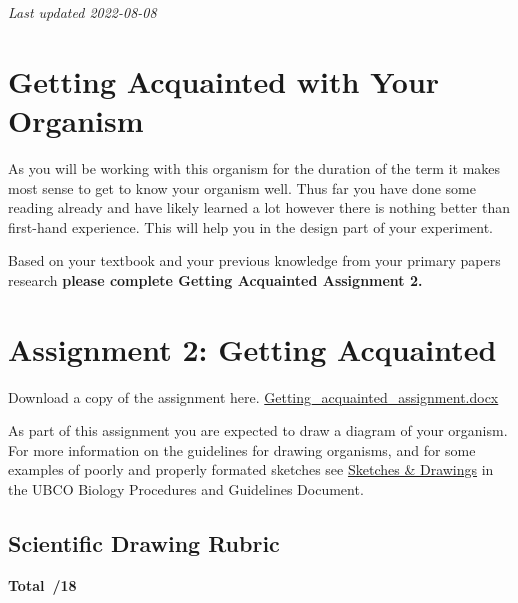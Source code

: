 \documentclass[
]{book}
\begin{document}
\emph{Last updated 2022-08-08}

\hypertarget{getting-acquainted-with-your-organism}{%
\chapter*{Getting Acquainted with Your Organism}\label{getting-acquainted-with-your-organism}}

As you will be working with this organism for the duration of the term it makes most sense to get to know your organism well. Thus far you have done some reading already and have likely learned a lot however there is nothing better than first-hand experience. This will help you in the design part of your experiment.

Based on your textbook and your previous knowledge from your primary papers research \textbf{please complete Getting Acquainted Assignment 2.}

\hypertarget{assignment-2-getting-acquainted}{%
\chapter*{Assignment 2: Getting Acquainted}\label{assignment-2-getting-acquainted}}

Download a copy of the assignment here. \href{files/getting_acquainted_assignment.docx}{Getting\_acquainted\_assignment.docx}

As part of this assignment you are expected to draw a diagram of your organism. For more information on the guidelines for drawing organisms, and for some examples of poorly and properly formated sketches see \href{https://ubco-biology.github.io/Procedures-and-Guidelines/sketches-drawings.html}{Sketches \& Drawings} in the UBCO Biology Procedures and Guidelines Document.

\hypertarget{scientific-drawing-rubric}{%
\section*{Scientific Drawing Rubric}\label{scientific-drawing-rubric}}

\textbf{Total~/18}
\end{document}
